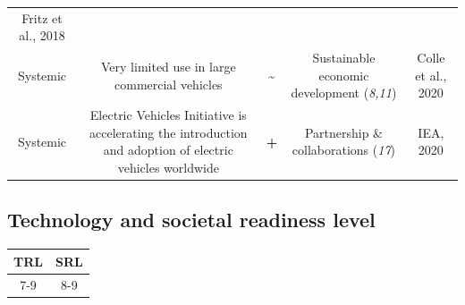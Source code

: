 \documentclass[
]{book}
\begin{document}
\begin{longtable}[]{@{}ccccc@{}}
\begin{minipage}[t]{0.17\columnwidth}
Fritz et al., 2018\strut
\end{minipage}\tabularnewline
\begin{minipage}[t]{0.17\columnwidth}\centering
Systemic\strut
\end{minipage} & \begin{minipage}[t]{0.16\columnwidth}\centering
Very limited use in large commercial vehicles\strut
\end{minipage} & \begin{minipage}[t]{0.17\columnwidth}\centering
\textbf{\textasciitilde{}}\strut
\end{minipage} & \begin{minipage}[t]{0.17\columnwidth}\centering
Sustainable economic development (\emph{8,11})\strut
\end{minipage} & \begin{minipage}[t]{0.17\columnwidth}\centering
Colle et al., 2020\strut
\end{minipage}\tabularnewline
\begin{minipage}[t]{0.17\columnwidth}\centering
Systemic\strut
\end{minipage} & \begin{minipage}[t]{0.16\columnwidth}\centering
Electric Vehicles Initiative is accelerating the introduction and adoption of electric vehicles worldwide\strut
\end{minipage} & \begin{minipage}[t]{0.17\columnwidth}\centering
\textbf{+}\strut
\end{minipage} & \begin{minipage}[t]{0.17\columnwidth}\centering
Partnership \& collaborations (\emph{17})\strut
\end{minipage} & \begin{minipage}[t]{0.17\columnwidth}\centering
IEA, 2020\strut
\end{minipage}\tabularnewline
\bottomrule
\end{longtable}

\hypertarget{technology-and-societal-readiness-level-34}{%
\subsection*{Technology and societal readiness level}\label{technology-and-societal-readiness-level-34}}

\begin{longtable}[]{@{}cc@{}}
\toprule
TRL & SRL\tabularnewline
\midrule
\endhead
7-9 & 8-9\tabularnewline
\bottomrule
\end{longtable}
\end{document}
